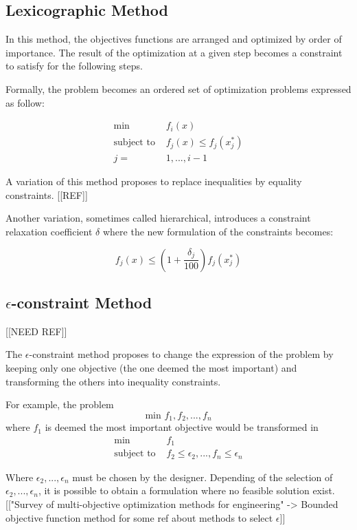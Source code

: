 \subsection{Lexicographic Method}

In this method, the objectives functions are arranged and optimized by order of importance. The result of the optimization at a given step becomes a constraint to satisfy for the following steps.

Formally, the problem becomes an ordered set of optimization problems expressed as follow:

\begin{align*}
\text{min } &f_i(x) \\
\text{subject to } &f_j(x) \leq f_j(x_j^*) \\
j = &1, ..., i-1
\end{align*}

A variation of this method proposes to replace inequalities by equality constraints. [[REF]]

Another variation, sometimes called hierarchical, introduces a constraint relaxation coefficient $\delta$ where the new formulation of the constraints becomes:

\[ f_j(x) \leq \left(1 + \frac{\delta_j}{100}\right) f_j(x_j^*) \]

\subsection{$\epsilon$-constraint Method}

[[NEED REF]]

The $\epsilon$-constraint method proposes to change the expression of the problem by keeping only one objective (the one deemed the most important) and transforming the others into inequality constraints.

For example, the problem \[\text{min } f_1, f_2, ...,f_n\] where $f_1$ is deemed the most important objective would be transformed in
\begin{align*}
\text{min } &f_1 \\
\text{subject to } &f_2 \leq \epsilon_2, ..., f_n \leq \epsilon_n
\end{align*}

Where $\epsilon_2, ..., \epsilon_n$ must be chosen by the designer.
Depending of the selection of $\epsilon_2, ..., \epsilon_n$, it is possible to obtain a formulation where no feasible solution exist.
[["Survey of multi-objective optimization methods for engineering" -> Bounded objective function method for some ref about methods to select $\epsilon$]]

